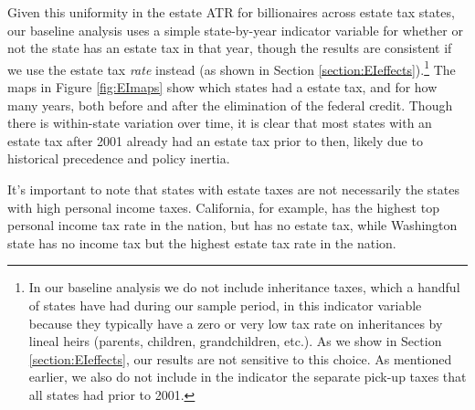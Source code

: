 \documentclass[12pt]{article}
\begin{document}
Given this uniformity in the estate ATR for billionaires across estate tax states, our baseline analysis uses a simple state-by-year indicator variable for whether or not the state has an estate tax in that year, though the results are consistent if we use the estate tax {\it rate} instead (as shown in Section \ref{section:EIeffects}).\footnote{In our baseline analysis we do not include inheritance taxes, which a handful of states have had during our sample period, in this indicator variable because they typically have a zero or very low tax rate on inheritances by lineal heirs (parents, children, grandchildren, etc.). As we show in Section \ref{section:EIeffects}, our results are not sensitive to this choice. As mentioned earlier, we also do not include in the indicator the separate pick-up taxes that all states had prior to 2001.} 
The maps in Figure \ref{fig:EImaps} show which states had a estate tax, and for how many years, both before and after the elimination of the federal credit. Though there is within-state variation over time, it is clear that most states with an estate tax after 2001 already had an estate tax prior to then, likely due to historical precedence and policy inertia.

It's important to note that states with estate taxes are not necessarily the states with high personal income taxes. California, for example, has the highest top personal income tax rate in the nation, but has no estate tax, while Washington state has no income tax but the highest estate tax rate in the nation. 
\end{document}
